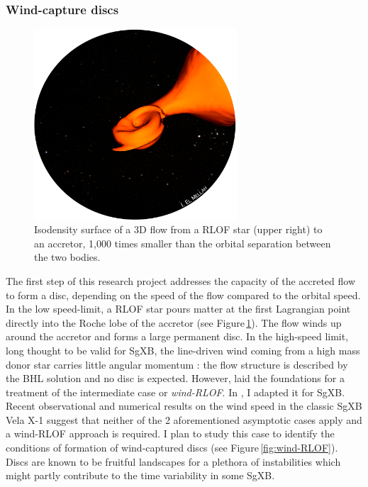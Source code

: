 \documentclass[a4paper,12pt,onecolumn]{article}
\makeatletter
\newcommand{\sgx}{SgXB\xspace}
\newcommand*{\rlof}{RLOF\@\xspace}
\makeatother
\begin{document}

\subsubsection*{Wind-capture discs}

\begin{figure}
\vspace*{-1.5cm}
\hspace*{0.1cm}
\includegraphics[height=7.1cm]{Figures/RLOF.png}
\caption{Isodensity surface of a 3D flow from a \rlof star (upper right) to an accretor, 1,000 times smaller than the orbital separation between the two bodies.}
\label{fig:bow2.5d}
\end{figure} 

The first step of this research project addresses the capacity of the accreted flow to form a disc, depending on the speed of the flow compared to the orbital speed. In the low speed-limit, a \rlof star pours matter at the first Lagrangian point directly into the Roche lobe of the accretor (see Figure\,\ref{fig:bow2.5d}). The flow winds up around the accretor and forms a large permanent disc. In the high-speed limit, long thought to be valid for \sgx, the line-driven wind coming from a high mass donor star carries little angular momentum : the flow structure is described by the BHL solution and no disc is expected. However, \cite{Mohamed2011} laid the foundations for a treatment of the intermediate case or \textit{wind-RLOF}. In \cite{ElMellah2016a}, I adapted it for \sgx. Recent observational and numerical results on the wind speed in the classic \sgx Vela X-1 suggest that neither of the 2 aforementioned asymptotic cases apply \citep{Gimenez-Garcia2016,Sander2017} and a wind-RLOF approach is required. I plan to study this case to identify the conditions of formation of wind-captured discs (see Figure\,\ref{fig:wind-RLOF}). Discs are known to be fruitful landscapes for a plethora of instabilities which might partly contribute to the time variability in some \sgx.\\ \\
\end{document}
